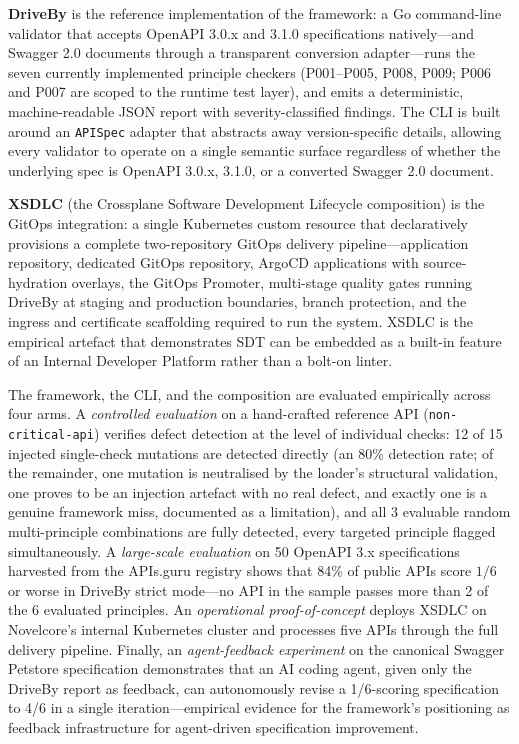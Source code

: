 \textbf{DriveBy} is the reference implementation of the framework: a Go command-line validator that accepts OpenAPI 3.0.x and 3.1.0 specifications natively---and Swagger 2.0 documents through a transparent conversion adapter---runs the seven currently implemented principle checkers (P001--P005, P008, P009; P006 and P007 are scoped to the runtime test layer), and emits a deterministic, machine-readable JSON report with severity-classified findings. The CLI is built around an \texttt{APISpec} adapter that abstracts away version-specific details, allowing every validator to operate on a single semantic surface regardless of whether the underlying spec is OpenAPI 3.0.x, 3.1.0, or a converted Swagger 2.0 document.

\textbf{XSDLC} (the Crossplane Software Development Lifecycle composition) is the GitOps integration: a single Kubernetes custom resource that declaratively provisions a complete two-repository GitOps delivery pipeline---application repository, dedicated GitOps repository, ArgoCD applications with source-hydration overlays, the GitOps Promoter, multi-stage quality gates running DriveBy at staging and production boundaries, branch protection, and the ingress and certificate scaffolding required to run the system. XSDLC is the empirical artefact that demonstrates SDT can be embedded as a built-in feature of an Internal Developer Platform rather than a bolt-on linter.

The framework, the CLI, and the composition are evaluated empirically across four arms. A \emph{controlled evaluation} on a hand-crafted reference API (\texttt{non-critical-api}) verifies defect detection at the level of individual checks: 12 of 15 injected single-check mutations are detected directly (an 80\% detection rate; of the remainder, one mutation is neutralised by the loader's structural validation, one proves to be an injection artefact with no real defect, and exactly one is a genuine framework miss, documented as a limitation), and all 3 evaluable random multi-principle combinations are fully detected, every targeted principle flagged simultaneously. A \emph{large-scale evaluation} on 50 OpenAPI 3.x specifications harvested from the APIs.guru registry shows that 84\% of public APIs score $1/6$ or worse in DriveBy strict mode---no API in the sample passes more than 2 of the 6 evaluated principles. An \emph{operational proof-of-concept} deploys XSDLC on Novelcore's internal Kubernetes cluster and processes five APIs through the full delivery pipeline. Finally, an \emph{agent-feedback experiment} on the canonical Swagger Petstore specification demonstrates that an AI coding agent, given only the DriveBy report as feedback, can autonomously revise a 1/6-scoring specification to 4/6 in a single iteration---empirical evidence for the framework's positioning as feedback infrastructure for agent-driven specification improvement.

